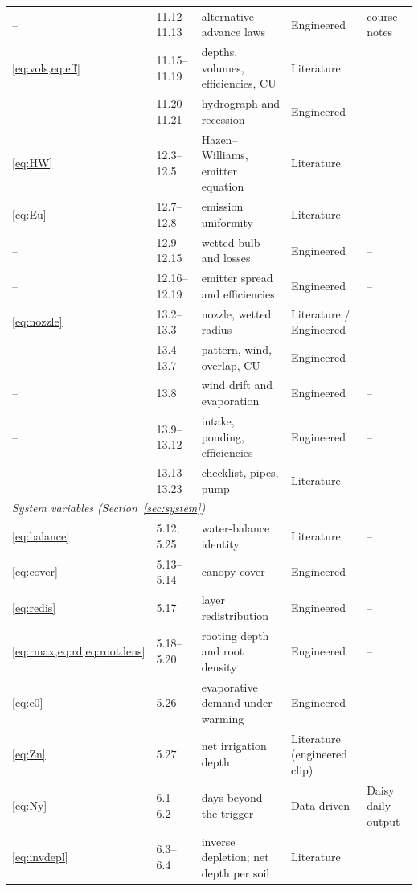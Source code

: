 \documentclass[preprint,12pt]{elsarticle}
\begin{document}
\begin{longtable}{p{1.7cm}p{1.6cm}p{4.9cm}p{2.2cm}p{3.4cm}}
-- & 11.12--11.13 & alternative advance laws & Engineered & course notes\\
\cref{eq:vols,eq:eff} & 11.15--11.19 & depths, volumes, efficiencies, CU & Literature & \cite{Walker1987,Burt1997,Christiansen1942}\\
-- & 11.20--11.21 & hydrograph and recession & Engineered & --\\
\cref{eq:HW} & 12.3--12.5 & Hazen--Williams, emitter equation & Literature & \cite{Hazen1905,KellerKarmeli1974}\\
\cref{eq:Eu} & 12.7--12.8 & emission uniformity & Literature & \cite{KellerKarmeli1974}\\
-- & 12.9--12.15 & wetted bulb and losses & Engineered & --\\
-- & 12.16--12.19 & emitter spread and efficiencies & Engineered & --\\
\cref{eq:nozzle} & 13.2--13.3 & nozzle, wetted radius & Literature / Engineered & \cite{Keller1990}\\
-- & 13.4--13.7 & pattern, wind, overlap, CU & Engineered & \cite{Christiansen1942}\\
-- & 13.8 & wind drift and evaporation & Engineered & --\\
-- & 13.9--13.12 & intake, ponding, efficiencies & Engineered & --\\
-- & 13.13--13.23 & checklist, pipes, pump & Literature & \cite{Keller1990,Blasius1913}\\\midrule
\multicolumn{5}{l}{\emph{System variables (Section~\ref{sec:system})}}\\
\cref{eq:balance} & 5.12, 5.25 & water-balance identity & Literature & --\\
\cref{eq:cover} & 5.13--5.14 & canopy cover & Engineered & --\\
\cref{eq:redis} & 5.17 & layer redistribution & Engineered & --\\
\cref{eq:rmax,eq:rd,eq:rootdens} & 5.18--5.20 & rooting depth and root density & Engineered & --\\
\cref{eq:e0} & 5.26 & evaporative demand under warming & Engineered & --\\
\cref{eq:Zn} & 5.27 & net irrigation depth & Literature (engineered clip) & \cite{Allen1998}\\
\cref{eq:Ny} & 6.1--6.2 & days beyond the trigger & Data-driven & Daisy daily output\\
\cref{eq:invdepl} & 6.3--6.4 & inverse depletion; net depth per soil & Literature & \cite{vanGenuchten1980,Allen1998}\\

\end{longtable}
\end{document}
